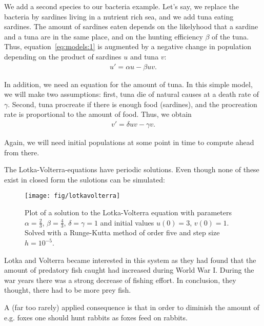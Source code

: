 \begin{example}
  We add a second species to our bacteria example. Let's say, we
  replace the bacteria by sardines living in a nutrient rich sea, and
  we add tuna eating sardines. The amount of sardines eaten depends on
  the likelyhood that a sardine and a tuna are in the same place, and
  on the hunting efficiency $\beta$ of the tuna. Thus,
  equation~\eqref{eq:models:1} is augmented by a negative change in
  population depending on the product of sardines $u$ and tuna $v$:
  \begin{gather*}
    u' = \alpha u - \beta u v.
  \end{gather*}

  In addition, we need an equation for the amount of tuna. In this
  simple model, we will make two assumptions: first, tuna die of
  natural causes at a death rate of $\gamma$. Second, tuna procreate
  if there is enough food (sardines), and the procreation rate is
  proportional to the amount of food. Thus, we obtain
  \begin{gather*}
    v' = \delta u v - \gamma v.
  \end{gather*}

  Again, we will need initial populations at some point in time to
  compute ahead from there.
\end{example}

\begin{remark}
  The Lotka-Volterra-equations have periodic solutions. Even though
  none of these exist in closed form the sulotions can be simulated:
  \begin{figure}[tp]
    \begin{center}
      \texttt{[image: fig/lotkavolterra]}
      \caption{Plot of a solution to the Lotka-Volterra equation with
        parameters $\alpha = \frac 23$, $\beta  = \frac 43$, $\delta = \gamma = 1$
        and initial values $u(0) = 3$, $v(0) = 1$. Solved with a Runge-Kutta
        method of order five and step size $h = 10^{-5}$.}
    \end{center}
    \label{fig:lotkavolterra}  
  \end{figure}
  Lotka and Volterra became interested in this system as they had
  found that the amount of predatory fish caught had increased
  during World War I. During the war years there was a strong
  decrease of fishing effort. In conclusion, they thought, there had
  to be more prey fish.
  
  A (far too rarely) applied consequence is that in order to diminish
  the amount of e.g. foxes one should hunt rabbits as foxes feed
  on rabbits.
\end{remark}

